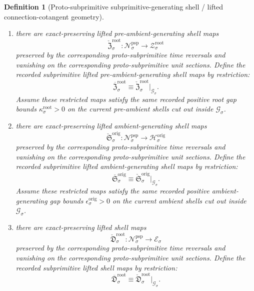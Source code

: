 \documentclass[11pt]{article}
\newcommand{\ShellTarget}[1]{\mathcal E_{#1}}
\newcommand{\OriginTarget}[1]{\mathcal H_{#1}^{\mathrm{orig}}}
\newcommand{\OriginGap}[1]{\epsilon_{#1}^{\mathrm{orig}}}
\newcommand{\RootTarget}[1]{\mathcal Z_{#1}^{\mathrm{root}}}
\newcommand{\RootGap}[1]{\kappa_{#1}^{\mathrm{root}}}
\newcommand{\PrimGap}[1]{\lambda_{#1}^{\mathrm{prim}}}
\newcommand{\SubprimSpace}[1]{\mathcal G_{#1}}
\newcommand{\SubprimLiftedPreAmbient}[1]{\overline{\mathfrak Z}_{#1}^{\mathrm{root}}}
\newcommand{\SubprimLiftedAmbient}[1]{\overline{\mathfrak S}_{#1}^{\mathrm{orig}}}
\newcommand{\SubprimLiftedShell}[1]{\overline{\mathfrak D}_{#1}^{\mathrm{root}}}
\newcommand{\ProtoSubprimSpace}[1]{\mathcal N_{#1}^{\mathrm{psp}}}
\newcommand{\ProtoSubprimLiftedPreAmbient}[1]{\check{\mathfrak Z}_{#1}^{\mathrm{root}}}
\newcommand{\ProtoSubprimLiftedAmbient}[1]{\check{\mathfrak S}_{#1}^{\mathrm{orig}}}
\newcommand{\ProtoSubprimLiftedShell}[1]{\check{\mathfrak D}_{#1}^{\mathrm{root}}}
\newtheorem{definition}{Definition}
\begin{document}
\begin{definition}[Proto-subprimitive subprimitive-generating shell / lifted connection-cotangent geometry]
\begin{enumerate}
\begin{equation}
    \end{equation}
    Assume these restricted maps satisfy the same recorded positive primitive gap bounds \(\PrimGap{\sigma}>0\) on the current root shells cut out inside \(\SubprimSpace{\sigma}\).
    \item there are exact-preserving lifted pre-ambient-generating shell maps
    \[
    \ProtoSubprimLiftedPreAmbient{\sigma}:\ProtoSubprimSpace{\sigma}\to\RootTarget{\sigma}
    \]
    preserved by the corresponding proto-subprimitive time reversals and vanishing on the corresponding proto-subprimitive unit sections. Define the recorded subprimitive lifted pre-ambient-generating shell maps by restriction:
    \begin{equation}
    \SubprimLiftedPreAmbient{\sigma}\equiv \ProtoSubprimLiftedPreAmbient{\sigma}|_{\SubprimSpace{\sigma}}.
    \label{eq:subprimitive_preambient_from_protosubprimitive}
    \end{equation}
    Assume these restricted maps satisfy the same recorded positive root gap bounds \(\RootGap{\sigma}>0\) on the current pre-ambient shells cut out inside \(\SubprimSpace{\sigma}\).
    \item there are exact-preserving lifted ambient-generating shell maps
    \[
    \ProtoSubprimLiftedAmbient{\sigma}:\ProtoSubprimSpace{\sigma}\to\OriginTarget{\sigma}
    \]
    preserved by the corresponding proto-subprimitive time reversals and vanishing on the corresponding proto-subprimitive unit sections. Define the recorded subprimitive lifted ambient-generating shell maps by restriction:
    \begin{equation}
    \SubprimLiftedAmbient{\sigma}\equiv \ProtoSubprimLiftedAmbient{\sigma}|_{\SubprimSpace{\sigma}}.
    \label{eq:subprimitive_ambient_from_protosubprimitive}
    \end{equation}
    Assume these restricted maps satisfy the same recorded positive ambient-generating gap bounds \(\OriginGap{\sigma}>0\) on the current ambient shells cut out inside \(\SubprimSpace{\sigma}\).
    \item there are exact-preserving lifted shell maps
    \[
    \ProtoSubprimLiftedShell{\sigma}:\ProtoSubprimSpace{\sigma}\to\ShellTarget{\sigma}
    \]
    preserved by the corresponding proto-subprimitive time reversals and vanishing on the corresponding proto-subprimitive unit sections. Define the recorded subprimitive lifted shell maps by restriction:
    \begin{equation}
    \SubprimLiftedShell{\sigma}\equiv \ProtoSubprimLiftedShell{\sigma}|_{\SubprimSpace{\sigma}}.

\end{equation}
\end{enumerate}
\end{definition}
\end{document}
